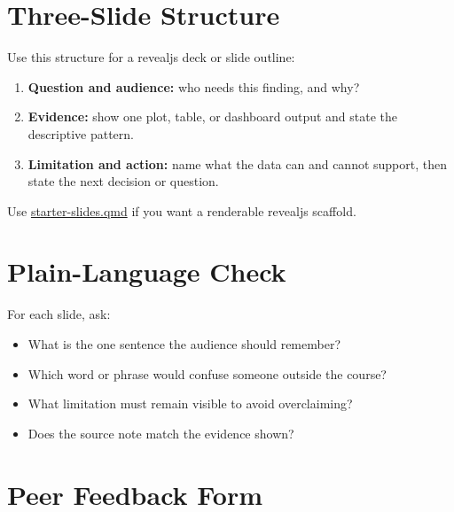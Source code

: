 \documentclass[
  letterpaper,
  DIV=11,
  numbers=noendperiod,
  oneside]{scrreprt}
\providecommand{\tightlist}{%
  \setlength{\itemsep}{0pt}\setlength{\parskip}{0pt}}
\begin{document}
\section*{Three-Slide Structure}\label{three-slide-structure}


Use this structure for a revealjs deck or slide outline:

\begin{enumerate}
\def\labelenumi{\arabic{enumi}.}
\tightlist
\item
  \textbf{Question and audience:} who needs this finding, and why?
\item
  \textbf{Evidence:} show one plot, table, or dashboard output and state
  the descriptive pattern.
\item
  \textbf{Limitation and action:} name what the data can and cannot
  support, then state the next decision or question.
\end{enumerate}

Use \url{starter-slides.qmd} if you want a renderable revealjs scaffold.

\section*{Plain-Language Check}\label{plain-language-check}


For each slide, ask:

\begin{itemize}
\tightlist
\item
  What is the one sentence the audience should remember?
\item
  Which word or phrase would confuse someone outside the course?
\item
  What limitation must remain visible to avoid overclaiming?
\item
  Does the source note match the evidence shown?
\end{itemize}

\section*{Peer Feedback Form}\label{peer-feedback-form}

\end{document}
